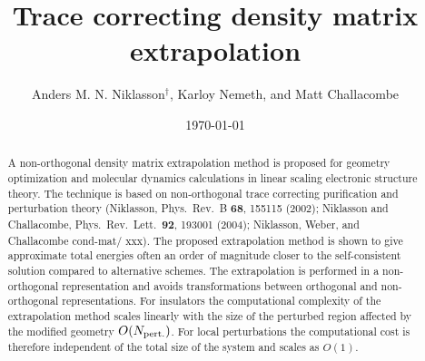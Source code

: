 \documentclass[twocolumn,showpacs,preprintnumbers,amsmath,amssymb]{revtex4}
\begin{document}

\title{Trace correcting density matrix extrapolation}


\author{Anders M. N. Niklasson$^{\dagger}$, Karloy Nemeth, and Matt Challacombe}

\date{\today}

\begin{abstract}
A non-orthogonal density matrix extrapolation method is proposed for geometry optimization 
and molecular dynamics calculations in linear scaling electronic structure theory.
The technique is based on non-orthogonal trace correcting purification and 
perturbation theory (Niklasson, Phys.\ Rev.\ B {\bf 68}, 155115 (2002); 
Niklasson and Challacombe, Phys.\ Rev.\ Lett.\ {\bf 92}, 193001 (2004);
Niklasson, Weber, and Challacombe cond-mat/ xxx).
The proposed extrapolation method is shown to give approximate total energies 
often an order of magnitude closer to the self-consistent solution compared 
to alternative schemes. The extrapolation is performed in a non-orthogonal
representation and avoids transformations between orthogonal and 
non-orthogonal representations.  For insulators the computational complexity 
of the extrapolation method scales linearly with the size of the perturbed 
region affected by the modified geometry $O(N_{\rm pert.})$. For local 
perturbations the computational cost is therefore independent of the total 
size of the system and scales as $O(1)$.
\end{abstract}

\maketitle
\end{document}
